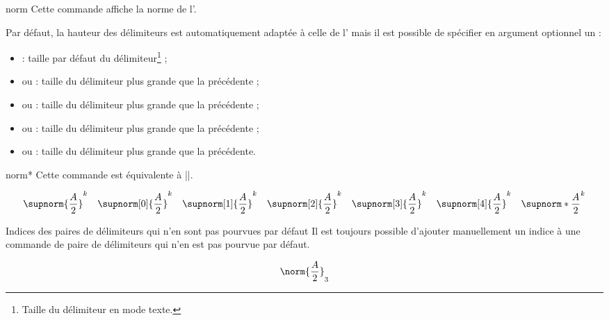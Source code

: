 \documentclass[english,nolocaltoc]{nwejmart}
\newtheorem[style=definition]{fait}
\newtheorem[title=expérience]{experience}
\newtheorem[title-plural=anneaux]{anneau}
\newtheorem[title=idéal,title-plural=idéaux]{ideal}
\begin{document}
\begin{docCommand*}{norm}{}
  Cette commande affiche la norme de l'.

  Par défaut, la hauteur des délimiteurs est automatiquement adaptée à celle de
  l' mais il est possible de spécifier en argument optionnel un
   :
  \begin{itemize}
  \item {} : taille par défaut du délimiteur\footnote{Taille du
      délimiteur en mode texte.} ;
  \item {} ou  : taille du délimiteur plus grande
    que la précédente ;
  \item {} ou  : taille du délimiteur plus grande
    que la précédente ;
  \item {} ou  : taille du délimiteur plus grande
    que la précédente ;
  \item {} ou  : taille du délimiteur plus grande
    que la précédente.
  \end{itemize}
\end{docCommand*}

\begin{docCommand}{norm*}{}
  Cette commande est équivalente à ||.
\end{docCommand}

\begin{bodycode}
\begin{equation}
\supnorm{\frac{A}{2}}^k    \quad
\supnorm[0]{\frac{A}{2}}^k \quad
\supnorm[1]{\frac{A}{2}}^k \quad
\supnorm[2]{\frac{A}{2}}^k \quad
\supnorm[3]{\frac{A}{2}}^k \quad
\supnorm[4]{\frac{A}{2}}^k \quad
\supnorm*{\frac{A}{2}}^k
\end{equation}
\end{bodycode}

\begin{dbremark}{Indices des paires de délimiteurs qui n'en sont pas pourvues par défaut}{}
  Il est toujours possible d'ajouter manuellement un indice à une commande de
  paire de délimiteurs qui n'en est pas pourvue par défaut.
\begin{bodycode}
\begin{equation}
\norm{\frac{A}{2}}_3
\end{equation}
\end{bodycode}
\end{dbremark}
\end{document}
